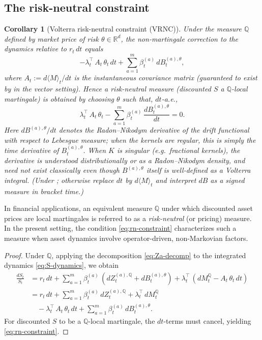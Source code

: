 \documentclass[11pt]{article}
\theoremstyle{plain}
\newtheorem{corollary}{Corollary}[section]
\theoremstyle{definition}
\theoremstyle{remark}
\newcommand{\R}{\mathbb{R}}
\newcommand{\QQ}{\mathbb{Q}}
\newcommand{\bracket}[1]{\langle #1 \rangle}
\begin{document}
\subsection{The risk-neutral constraint}

\begin{corollary}[Volterra risk-neutral constraint (VRNC)]\label{cor:rn-constraint}
Under the measure $\QQ$ defined by market price of risk $\theta \in \R^d$, the
non-martingale correction to the dynamics relative to $r_t\,dt$ equals
\[
-\lambda_t^\top\,A_t\,\theta_t\,dt + \sum_{a=1}^m \beta_t^{(a)}\,dB_t^{(a),\theta},
\]
where $A_t := d\bracket{M}_t/dt$ is the instantaneous covariance matrix
(guaranteed to exist by  in the vector setting).
Hence a risk-neutral measure (discounted $S$ a $\QQ$-local martingale) is
obtained by choosing $\theta$ such that, $dt$-a.e.,
\begin{equation}\label{eq:rn-constraint}
\lambda_t^\top\,A_t\,\theta_t - \sum_{a=1}^m \beta_t^{(a)}\,\frac{dB_t^{(a),\theta}}{dt} = 0.
\end{equation}
Here $dB^{(a),\theta}/dt$ denotes the Radon--Nikodym derivative of the drift
functional with respect to Lebesgue measure; when the kernels are regular,
this is simply the time derivative of $B_t^{(a),\theta}$.
When $K$ is singular (e.g.\ fractional kernels), the derivative is understood
distributionally or as a Radon--Nikodym density, and need not exist classically
even though $B^{(a),\theta}$ itself is well-defined as a Volterra integral.
(Under ; otherwise replace $dt$ by $d\bracket{M}_t$ and
interpret $dB$ as a signed measure in bracket time.)
\end{corollary}

In financial applications, an equivalent measure $\QQ$ under which discounted
asset prices are local martingales is referred to as a \emph{risk-neutral}
(or pricing) measure. In the present setting, the condition
\eqref{eq:rn-constraint} characterizes such a measure when asset dynamics
involve operator-driven, non-Markovian factors.

\begin{proof}
Under $\QQ$, applying the decomposition \eqref{eq:Za-decomp} to the
integrated dynamics \eqref{eq:S-dynamics}, we obtain
\begin{align*}
\frac{dS_t}{S_t} &= r_t\,dt + \sum_{a=1}^m \beta_t^{(a)}\,(dZ_t^{(a),\QQ} + dB_t^{(a),\theta})
+ \lambda_t^\top\,(dM_t^{\QQ} - A_t\,\theta_t\,dt) \\
&= r_t\,dt + \sum_{a=1}^m \beta_t^{(a)}\,dZ_t^{(a),\QQ} + \lambda_t^\top\,dM_t^{\QQ} \\
&\quad - \lambda_t^\top\,A_t\,\theta_t\,dt + \sum_{a=1}^m \beta_t^{(a)}\,dB_t^{(a),\theta}.
\end{align*}
For discounted $S$ to be a $\QQ$-local martingale, the $dt$-terms
must cancel, yielding \eqref{eq:rn-constraint}.
\end{proof}
\end{document}
